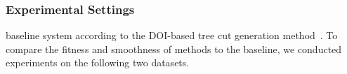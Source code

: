 
\subsubsection{Experimental Settings}
 baseline system  according to the DOI-based tree cut generation method~\cite{cui2014}.
To compare the fitness and smoothness of  methods to the baseline, we conducted experiments on the following two datasets.

